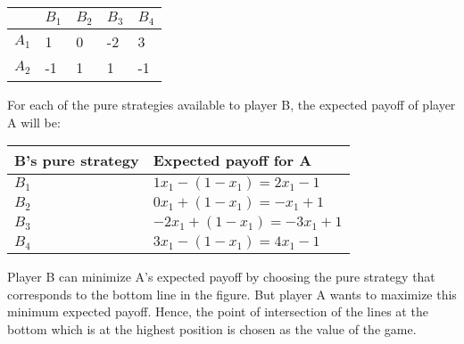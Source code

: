 \documentclass[12pt]{article}
\begin{document}
\begin{center}
  \begin{tabular}{|l|l|l|l|l|}
    \hline
    & $B_1$ & $B_2$ & $B_3$ & $B_4$ \\
    \hline
    $A_1$ & 1     & 0     & -2    & 3     \\ 
    $A_2$ & -1    & 1     & 1     & -1    \\ 
    \hline
  \end{tabular}
\end{center}
For each of the pure strategies available to player B, the expected payoff of player A will be:
\begin{center}
  \begin{tabular}{|l|l|}
    \hline
    \textbf{B's pure strategy} & \textbf{Expected payoff for A}             \\
    \hline
    $B_1$                      & $1 x_1 -\left(1-x_1\right) = 2x_1-1      $ \\
    $B_2$                      & $0 x_1 +\left(1-x_1\right) = -x_1+1      $ \\
    $B_3$                      & $-2 x_1 +  \left(1-x_1\right) = -3 x_1+1 $ \\
    $B_4$                      & $3 x_1 - \left(1-x_1\right) = 4 x_1 - 1  $ \\
    \hline
  \end{tabular}
\end{center}
Player B can minimize A's expected payoff by choosing the pure strategy that corresponds to the bottom line in the figure. But player A wants to maximize this minimum expected payoff. Hence, the point of intersection of the lines at the bottom which is at the highest position is chosen as the value of the game.
\end{document}
